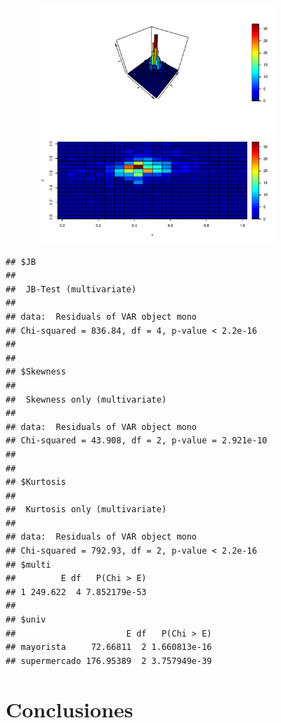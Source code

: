\documentclass[12pt, twoside]{book}\usepackage[]{graphicx}\usepackage[]{color}
\makeatletter
\newenvironment{kframe}{%
 \def\at@end@of@kframe{}%
 \ifinner\ifhmode%
  \def\at@end@of@kframe{\end{minipage}}%
  \begin{minipage}{\columnwidth}%
 \fi\fi%
 \def\FrameCommand##1{\hskip\@totalleftmargin \hskip-\fboxsep
 \colorbox{shadecolor}{##1}\hskip-\fboxsep
     \hskip-\linewidth \hskip-\@totalleftmargin \hskip\columnwidth}%
 \MakeFramed {\advance\hsize-\width
   \@totalleftmargin\z@ \linewidth\hsize
   \@setminipage}}%
 {\par\unskip\endMakeFramed%
 \at@end@of@kframe}
\newenvironment{knitrout}{}{} %
\numberwithin{equation}{section}
\numberwithin{theorem}{section}
\numberwithin{teorema}{section}
\numberwithin{defi}{section}
\numberwithin{prop}{section}
\numberwithin{defi}{section}
\theoremstyle{plain}
\makeatother
\begin{document}
\begin{knitrout}
\color{fgcolor}

{\centering \includegraphics[width=4.5in,height=3.5in]{figure/unnamed-chunk-17-1} 

}



\end{knitrout}

\begin{knitrout}
\color{fgcolor}\begin{kframe}
\begin{verbatim}
## $JB
## 
## 	JB-Test (multivariate)
## 
## data:  Residuals of VAR object mono
## Chi-squared = 836.84, df = 4, p-value < 2.2e-16
## 
## 
## $Skewness
## 
## 	Skewness only (multivariate)
## 
## data:  Residuals of VAR object mono
## Chi-squared = 43.908, df = 2, p-value = 2.921e-10
## 
## 
## $Kurtosis
## 
## 	Kurtosis only (multivariate)
## 
## data:  Residuals of VAR object mono
## Chi-squared = 792.93, df = 2, p-value < 2.2e-16
## $multi
##         E df   P(Chi > E)
## 1 249.622  4 7.852179e-53
## 
## $univ
##                      E df   P(Chi > E)
## mayorista     72.66811  2 1.660813e-16
## supermercado 176.95389  2 3.757949e-39
\end{verbatim}
\end{kframe}
\end{knitrout}

\nocite{greene2003}

\chapter{Conclusiones}
\end{document}
